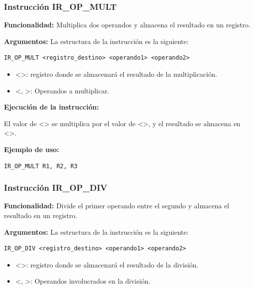 \subsubsection{Instrucción IR\_OP\_MULT}\label{subsubsec:IR_OP_MULT}
\noindent
\textbf{Funcionalidad:} Multiplica dos operandos y almacena el resultado en un registro.

\noindent
\textbf{Argumentos:} La estructura de la instrucción es la siguiente:
\begin{verbatim}
IR_OP_MULT <registro_destino> <operando1> <operando2>
\end{verbatim}
\begin{itemize}
    \item <>: registro donde se almacenará el resultado de la multiplicación.
    \item <, >: Operandos a multiplicar.
\end{itemize}

\noindent
\textbf{Ejecución de la instrucción:}
\vspace{0.3cm}

\noindent
El valor de <> se multiplica por el valor de <>, y el resultado se almacena en <>.
\vspace{0.3cm}

\noindent
\textbf{Ejemplo de uso:}
\begin{verbatim}
IR_OP_MULT R1, R2, R3
\end{verbatim}

\subsubsection{Instrucción IR\_OP\_DIV}\label{subsubsec:IR_OP_DIV}
\noindent
\textbf{Funcionalidad:} Divide el primer operando entre el segundo y almacena el resultado en un registro.

\noindent
\textbf{Argumentos:} La estructura de la instrucción es la siguiente:
\begin{verbatim}
IR_OP_DIV <registro_destino> <operando1> <operando2>
\end{verbatim}
\begin{itemize}
    \item <>: registro donde se almacenará el resultado de la división.
    \item <, >: Operandos involucrados en la división.
\end{itemize}

